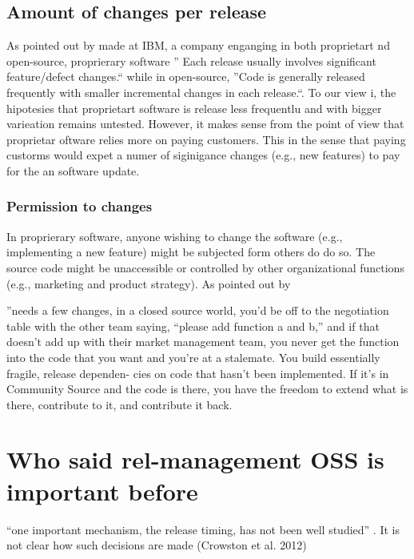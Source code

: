  
 \subsection{Amount of changes per release}
 
 
 As pointed out by made at IBM, a company enganging in both proprietart nd open-source,  proprierary software '' Each 
release usually involves significant 
feature/defect changes.`` while in open-source, ''Code is generally released 
frequently with smaller incremental 
changes in each release.``. To our view i, the hipotesies that proprietart software is release less frequentlu and with bigger varieation remains untested. However, it makes sense from the point of view that proprietar oftware relies more on paying customers. This in the sense that paying custorms would expet a numer of siginigance changes (e.g., new features) to pay for the an software update. 
  
  
  
 
  
  
 \subsubsection{Permission to changes} 
 
 In proprierary software, anyone wishing to change the software (e.g., implementing a new feature) might be subjected form others do do so. The source code might be unaccessible or controlled by other organizational functions (e.g., marketing and product strategy).  As pointed out by  \citet{VitharanaKing_et_al2010}
 
 
''needs a few changes, in a closed source world, you’d be off to the negotiation table with the other 
team saying, “please add function a and b,” and if that doesn’t add up with their  
market  management  team,  you  never  get  the  function  into  the  code  that  you 
want and you’re at a stalemate. You build essentially fragile, release dependen-
cies on code that hasn’t been implemented. If it’s in Community Source and 
the code is there, you have the freedom to extend what is there, contribute to it, 
and contribute it back. \citep{VitharanaKing_et_al2010}
 
 
 
     \section{Who said rel-management OSS is important before }
    
    
    ``one important mechanism, the release timing, has not been well studied'' .  It is not clear how such decisions are made (Crowston et al. 2012)
    

